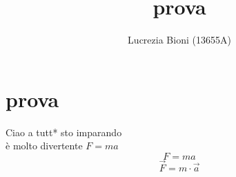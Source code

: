 \documentclass{article} %
\title{prova} %
\author{Lucrezia Bioni (13655A)} %
\date{} %
\begin{document}
    \maketitle
    \section{prova} %
    Ciao a tutt* sto imparando \\ %
    è molto divertente
    $ F = m a $ %
    $$ F = m a $$ %
    $$ \vec{F} = m \cdot \vec{a}  $$
\end{document}
